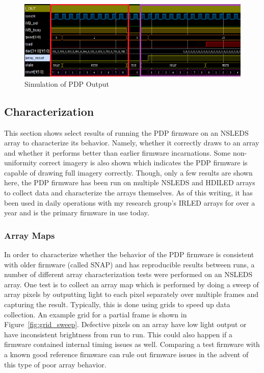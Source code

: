     \begin{figure}
        \centering
        \includegraphics[width=1.0\textwidth]{fig/pdp_output_example.png}
        \caption{Simulation of PDP Output}
        \label{fig:output_example}
    \end{figure}

    \subsection{Characterization}
        This section shows select results of running the PDP firmware on an NSLEDS array to characterize its behavior. Namely, whether it correctly draws to an array and whether it performs better than earlier firmware incarnations. Some non-uniformity correct imagery is also shown which indicates the PDP firmware is capable of drawing full imagery correctly. Though, only a few results are shown here, the PDP firmware has been run on multiple NSLEDS and HDILED arrays to collect data and characterize the arrays themselves. As of this writing, it has been used in daily operations with my research group's IRLED arrays for over a year and is the primary firmware in use today.

        \subsubsection {Array Maps}
            In order to characterize whether the behavior of the PDP firmware is consistent with older firmware (called SNAP) and has reproducible results between runs, a number of different array characterization tests were performed on an NSLEDS array. One test is to collect an array map which is performed by doing a sweep of array pixels by outputting light to each pixel separately over multiple frames and capturing the result. Typically, this is done using grids to speed up data collection. An example grid for a partial frame is shown in Figure~\ref{fig:grid_sweep}. Defective pixels on an array have low light output or have inconsistent brightness from run to run. This could also happen if a firmware contained internal timing issues as well. Comparing a test firmware with a known good reference firmware can rule out firmware issues in the advent of this type of poor array behavior.

